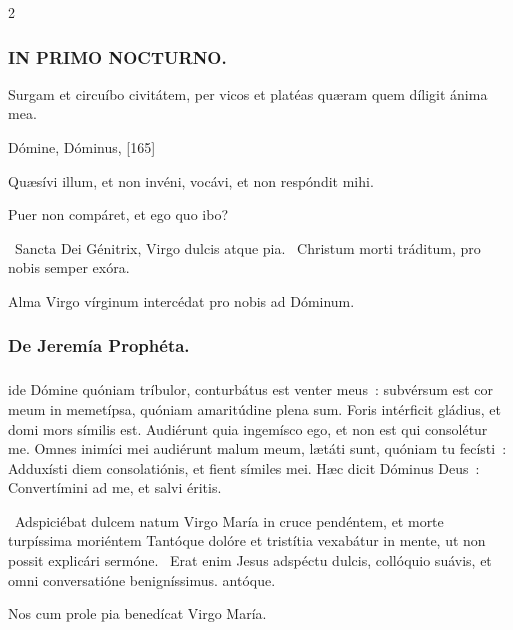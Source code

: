 \documentclass[9pt,twoside]{extarticle}
\begin{document}
\begin{multicols}{2}
\subsubsection*{\center \textsc{IN PRIMO NOCTURNO.}}
\begin{tightlist}{}
\item {} Surgam et circuíbo civitátem, per vicos et platéas quæram quem díligit ánima mea.
\item {} Dómine, Dóminus,  [165]
\item {} Quæsívi illum, et non invéni, vocávi, et non respóndit mihi.
\item {} Puer non compáret, et ego quo ibo?
\item {}~Sancta Dei Génitrix, Virgo dulcis atque pia. ~Christum morti tráditum, pro nobis semper exóra.
\item {}
\item {\small {} Alma Virgo vírginum intercédat pro nobis ad Dóminum.}
\end{tightlist}

\subsubsection*{\center De Jeremía Prophéta.}
\subsubsection*{\center {}}
ide Dómine quóniam tríbulor, conturbátus est venter meus~: subvérsum est cor meum in memetípsa, quóniam amaritúdine plena sum. Foris intérficit gládius, et domi mors símilis est.
Audiérunt quia ingemísco ego, et non est qui consolétur me. Omnes inimíci mei audiérunt malum meum, lætáti sunt, quóniam tu fecísti~: Adduxísti diem consolatiónis, et fient símiles mei. Hæc dicit Dóminus Deus~: Convertímini ad me, et salvi éritis.

\begin{tightlist}{}
\item {}~Adspiciébat dulcem natum Virgo María in cruce pendéntem, et morte turpíssima moriéntem \textred{*} Tantóque dolóre et tristítia vexabátur in mente, ut non possit explicári sermóne. ~Erat enim Jesus adspéctu dulcis, collóquio suávis, et omni conversatióne benigníssimus. antóque.
\item {\small {} Nos cum prole pia benedícat Virgo María.}
\end{tightlist}


\end{multicols}
\end{document}

